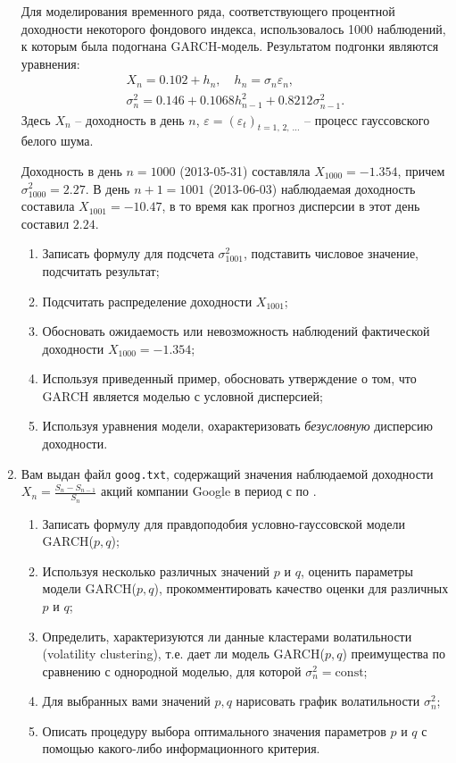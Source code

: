 \documentclass[a4paper,14pt]{extreport}
\renewcommand{\=}[1]{\stackrel{#1}{=}} %
\newcommand{\discretetime}{t = 1,\,2,\,\ldots}
\newcommand{\newprocessd}[1]{
	\ensuremath{
		#1 = \left(#1 _t\right)_{\discretetime}
	}
}
\begin{document}
\begin{enumerate}
	Для моделирования временного ряда, соответствующего процентной
	доходности некоторого фондового индекса, использовалось 1000 наблюдений,
	к которым была подогнана GARCH-модель. Результатом подгонки являются уравнения:
	\begin{align*}
	X_n = 0.102 + h_n, 
	\quad 
	h_n = \sigma_n \varepsilon_n, \\
	\sigma_n^2 = 0.146 + 0.1068 h_{n-1}^2 + 0.8212 \sigma_{n-1}^2.
	\end{align*}
	Здесь $X_n$ -- доходность в день $n$, $\newprocessd{\varepsilon}$ --
	процесс гауссовского белого шума.

	Доходность в день $n = 1000$ (2013-05-31) составляла
	$X_{1000} = -1.354$, причем $\sigma^2_{1000} =  2.27$.
	В день $n + 1 = 1001$ (2013-06-03)
	наблюдаемая доходность составила $X_{1001} = -10.47$,
	в то время как прогноз дисперсии в этот день составил $2.24$.

	\begin{enumerate}
	\item Записать формулу для подсчета $\sigma^2_{1001}$, 
	подставить числовое значение, подсчитать результат;
	\item Подсчитать распределение доходности $X_{1001}$;
	\item Обосновать ожидаемость или невозможность наблюдений
	фактической доходности $X_{1000} = -1.354$;
	\item Используя приведенный пример, обосновать утверждение
	о том, что GARCH является моделью с условной дисперсией;
	\item Используя уравнения модели, охарактеризовать
	{\em безусловную} дисперсию доходности.
	\end{enumerate}


	\item Вам выдан файл \texttt{goog.txt}, содержащий
	значения наблюдаемой доходности
	$X_n = \frac{S_n - S_{n-1}}{S_n}$ акций компании Google 
	в период с по .

	\begin{enumerate}
	\item Записать формулу для правдоподобия условно-гауссовской модели
	GARCH($p, q$);
	\item Используя несколько различных значений $p$ и $q$,
	оценить параметры модели GARCH($p, q$),
	прокомментировать качество оценки для различных $p$ и $q$;
	\item Определить, характеризуются ли данные кластерами волатильности
	(volatility clustering), т.е. дает ли модель GARCH($p, q$) 
	преимущества по сравнению с однородной моделью,
	для которой $\sigma^2_n = \mathrm{const}$;
	\item Для выбранных вами значений $p,q$ нарисовать график
	волатильности $\sigma^2_n$;
	\item Описать процедуру выбора оптимального значения параметров $p$ и $q$
	с помощью какого-либо информационного критерия.
	\end{enumerate} 


\end{enumerate}
\end{document}
